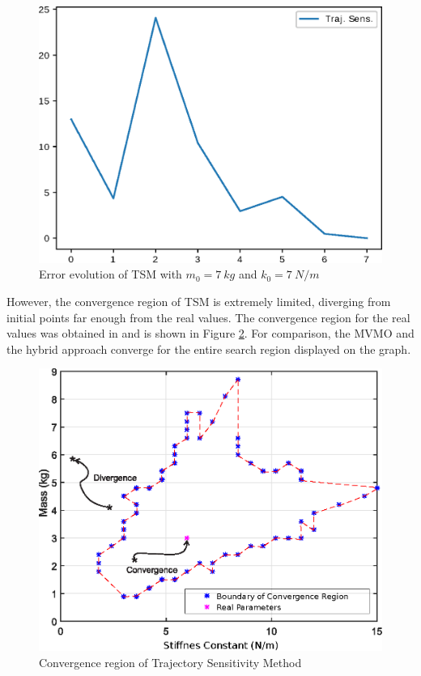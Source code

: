 \begin{figure}[h]
	\caption{Error evolution of TSM with $m_{0} = 7\ kg$ and $k_{0} = 7\ N/m$}
	\begin{center}
		\includegraphics[scale=0.7]{Images/TS_conv.eps}
	\end{center}
	\label{fig: TS_conv}
\end{figure}

However, the convergence region of TSM is extremely limited, diverging from initial points far enough from the real values. The convergence region for the real values was obtained in \cite{Ecyo} and is shown in Figure \ref{fig: conv_reg}. For comparison, the MVMO and the hybrid approach converge for the entire search region displayed on the graph.

\begin{figure}[h]
	\caption{Convergence region of Trajectory Sensitivity Method}
	\begin{center}
		\includegraphics[scale=0.7]{Images/Conv_reg.eps}
	\end{center}
	\label{fig: conv_reg}
\end{figure}

